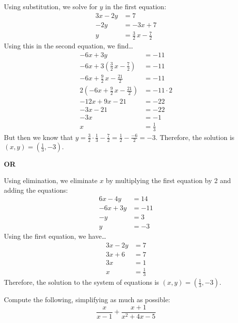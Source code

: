 \documentclass[11pt,letterpaper]{article}
\begin{document}
\sol Using substitution, we solve for $y$ in the first equation:
	\[
	\begin{aligned}
	3x - 2y&= 7 \\
	-2y&= -3x + 7 \\
	y&= \frac{3}{2}\,x - \frac{7}{2}
	\end{aligned}
	\] 
Using this in the second equation, we find\dots
	\[
	\begin{aligned}
	-6x + 3y&= -11 \\
	-6x + 3 \left( \frac{3}{2}\,x - \frac{7}{2} \right)&= -11 \\
	-6x + \frac{9}{2}\,x - \frac{21}{2}&= -11 \\
	2 \left( -6x + \frac{9}{2}\,x - \frac{21}{2} \right)&= -11 \cdot 2 \\
	-12x + 9x - 21&= -22 \\
	-3x - 21&= -22 \\
	-3x&= -1 \\
	x&= \frac{1}{3}
	\end{aligned}
	\] 
But then we know that $y= \frac{3}{2} \cdot \frac{1}{3} - \frac{7}{2}= \frac{1}{2} - \frac{-6}{2}= -3$. Therefore, the solution is $(x, y)= (\frac{1}{3}, -3)$. 
	
\begin{center} {\bfseries OR} \end{center}

Using elimination, we eliminate $x$ by multiplying the first equation by 2 and adding the equations:
	\[
	\begin{aligned}
	6x - 4y&= 14 \\
	-6x + 3y&= -11 \\ \hline
	-y&= 3 \\
	y&= -3
	\end{aligned}
	\] 
Using the first equation, we have\dots
	\[
	\begin{aligned}
	3x - 2y&= 7 \\
	3x + 6&= 7 \\
	3x&= 1 \\
	x&= \frac{1}{3}
	\end{aligned}
	\] 
Therefore, the solution to the system of equations is $(x, y)= (\frac{1}{3}, -3)$. 



\newpage



 Compute the following, simplifying as much as possible:
	\[
	\dfrac{x}{x - 1} + \dfrac{x + 1}{x^2 + 4x - 5}
	\] \pspace
\end{document}
